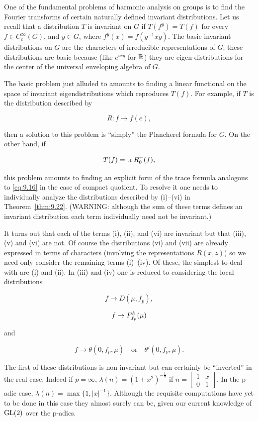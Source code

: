 \begin{remark}\label{rem:9.25}

One of the fundamental problems of harmonic analysis on groups is to find the Fourier transforms of certain naturally defined invariant distributions. Let us recall that a distribution $T$ is invariant on $G$ if $T(f^y) = T(f)$ for every $f \in C_c^\infty(G)$, and $y \in G$, where $f^y(x) = f(y^{-1}xy)$. The basic invariant distributions on $G$ are the characters of irreducible representations of $G$; these distributions are basic because (like $e^{ixy}$ for $\mathbb{R}$) they are eigen-distributions for the center of the universal enveloping algebra of $G$.

The basic problem just alluded to amounts to finding a linear functional on the space of invariant eigendistributions which reproduces $T(f)$. For example, if $T$ is the distribution described by

\[
R: f \to f(e),
\]

then a solution to this problem is ``simply'' the Plancherel formula for $G$. On the other hand, if

\[
T(f) = \operatorname{tr} R_0^{+}(f),
\]

this problem amounts to finding an explicit form of the trace formula analogous to \eqref{eq:9.16} in the case of compact quotient. To resolve it one needs to individually analyze the distributions described by (i)--(vi) in Theorem~\ref{thm:9.22}. (WARNING: although the sum of these terms defines an invariant distribution each term individually need not be invariant.)

It turns out that each of the terms (i), (ii), and (vi) are invariant but that (iii), (v) and (vi) are not. Of course the distributions (vi) and (vii) are already expressed in terms of characters (involving the representations $R(x, z)$) so we need only consider the remaining terms (i)--(iv). Of these, the simplest to deal with are (i) and (ii). In (iii) and (iv) one is reduced to considering the local distributions

\[
f \to D(\mu, f_p),
\]

\[
f \to F_{f_p}^{\mathbb{A}}(\mu)
\]

and

\[
f \to \theta(0, f_p, \mu) \quad \text{or} \quad \theta'(0, f_p, \mu).
\]

The first of these distributions is non-invariant but can certainly be ``inverted'' in the real case. Indeed if $p = \infty$, $\lambda(n) = (1 + x^2)^{-\frac{1}{2}}$ if $n = \begin{bmatrix} 1 & x \\ 0 & 1 \end{bmatrix}$. In the p-adic case, $\lambda(n) = \max\{1, |x|^{-1}\}$. Although the requisite computations have yet to be done in this case they almost surely can be, given our current knowledge of $\operatorname{GL}(2)$ over the p-adics.


\end{remark}
